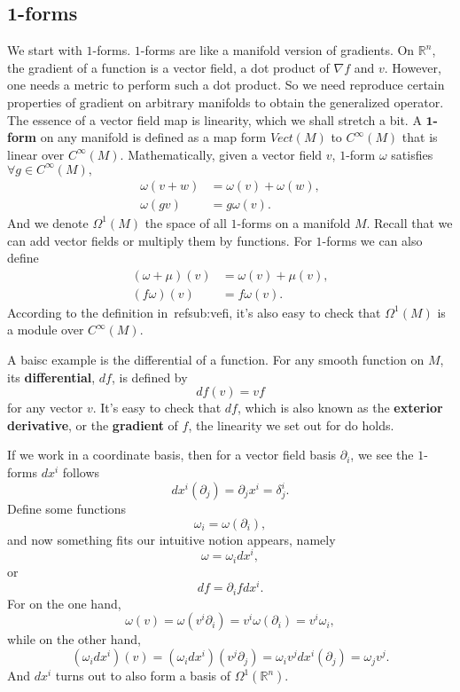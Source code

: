 \documentclass[a4paper,11pt]{article}
\theoremstyle{remark}
\begin{document}
\subsection{$\mathbf{1}$-forms}
\label{sub:1form}
We start with $1$-forms. $1$-forms are like a manifold version of
gradients. On
$\mathbb{R}^n$, the gradient of a function is a vector field, a dot
product of $\nabla f$ and $v$. However, one needs a metric to perform
such a dot product. So we need reproduce certain properties of gradient on
arbitrary manifolds to obtain the generalized operator. The essence of
a vector field map is linearity, which we shall stretch a bit. A
$\mathbf{1}$\textbf{-form} on any manifold is defined as a map form $Vect(M)$ to
$C^{\infty}(M)$ that is linear over $C^{\infty}(M)$. Mathematically,
given a vector field $v$, $1$-form $\omega$ satisfies $\forall g\in
C^{\infty}(M),$ 
\begin{align*}
  \omega(v+w) &= \omega(v) + \omega(w),\\
  \omega(g v) &= g \omega(v).
\end{align*}
And we denote $\Omega^1(M)$ the space of all $1$-forms on a manifold $M$.
Recall that we can add vector fields or multiply them by
functions. For $1$-forms we can also define
\begin{align*}
  (\omega + \mu)(v) &= \omega(v) + \mu(v),\\
  (f \omega)(v) &= f \omega(v).
\end{align*}
According to the definition in~ref{sub:vefi}, it's also easy to check
that $\Omega^1(M)$ is a module over $C^{\infty}(M)$.
\par
A baisc example is the differential of a function. For any smooth
function on $M$, its \textbf{differential}, $df$, is defined
by $$df(v) = v f$$ for any vector $v$. It's easy to check that
$df$, which is also known as the \textbf{exterior derivative}, or the
\textbf{gradient} of $f$, the linearity we set out for do holds.\par
If we work in a coordinate basis, then for a vector field basis
${\partial_i}$, we see the $1$-forms ${dx^i}$
follows $$dx^i(\partial_j) = \partial_jx^i = \delta^i_j.$$ Define some
functions $$\omega_i = \omega(\partial_i),$$ and now
something fits our intuitive notion appears, namely $$\omega =
\omega_idx^i,$$ or $$df  = \partial_i f dx^i.$$ For on the one
hand, $$\omega(v) = \omega(v^i\partial_i) = v^i\omega(\partial_i) =
v^i\omega_i,$$ while on the other hand, $$(\omega_idx^i)(v) =
(\omega_idx^i)(v^j\partial_j) = \omega_iv^jdx^i(\partial_j) =
\omega_jv^j.$$ And ${dx^i}$ turns out to also form a basis of
$\Omega^1(\mathbb{R}^n)$. 
\end{document}
